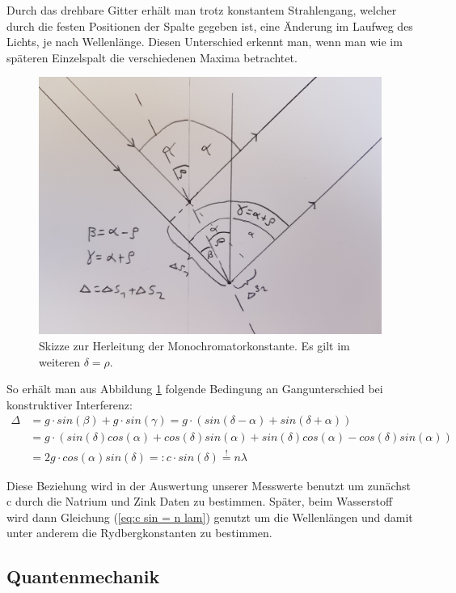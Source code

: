 \documentclass[]{article}
\begin{document}
Durch das drehbare Gitter erhält man trotz konstantem Strahlengang, welcher durch die festen Positionen der Spalte gegeben ist, eine Änderung im Laufweg des Lichts, je nach Wellenlänge. Diesen Unterschied erkennt man, wenn man wie im späteren Einzelspalt die verschiedenen Maxima betrachtet. 

\begin{figure}[H]
\centering
\includegraphics[width=.65\textwidth]{Plots/Ebert1.jpg}
\caption{Skizze zur Herleitung der Monochromatorkonstante. Es gilt im weiteren $\delta = \rho$.}
\label{fig:c Herleitung}
\end{figure}

So erhält man aus Abbildung \ref{fig:c Herleitung} folgende Bedingung an Gangunterschied bei konstruktiver Interferenz:
\begin{align}
\Delta &= g\cdot sin(\beta) + g\cdot sin(\gamma) = g\cdot \left( sin(\delta - \alpha) + sin(\delta + \alpha)  \right) \\
 &= g\cdot ( sin(\delta)cos(\alpha) + cos(\delta)sin(\alpha) +  sin(\delta)cos(\alpha) - cos(\delta)sin(\alpha) ) \\
 &= 2g \cdot cos(\alpha) sin(\delta) =: c \cdot sin(\delta) \stackrel{!}{=} n\lambda \label{eq:c sin = n lam}
\end{align}

Diese Beziehung wird in der Auswertung unserer Messwerte benutzt um zunächst c durch die Natrium und Zink Daten zu bestimmen. Später, beim Wasserstoff wird dann Gleichung (\ref{eq:c sin = n lam}) genutzt um die Wellenlängen und damit unter anderem die Rydbergkonstanten zu bestimmen.

\subsection{Quantenmechanik}
\end{document}
